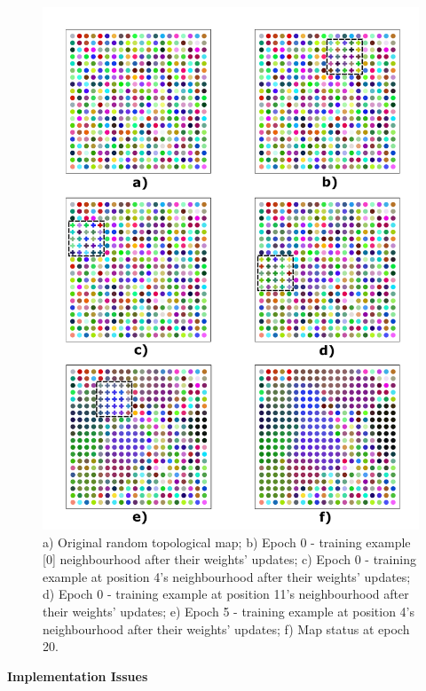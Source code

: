 \begin{figure}[h!]
\centering
\includegraphics[scale=0.35]{"Part 3 - Learning Systems/Unsupervised Learning/Self-Organizing Maps/figs/SOM_Exec.pdf"}
\caption{a) Original random topological map; b) Epoch 0 - training example [0] neighbourhood after their weights' updates; c) Epoch 0 - training example at position 4's  neighbourhood after their weights' updates; d) Epoch 0 - training example at position 11's neighbourhood after their weights' updates; e) Epoch 5 - training example at position 4's neighbourhood after their weights' updates; f) Map status at epoch 20.}
\label{fig:execution}
\end{figure}



\vspace{0.2cm}

\noindent \textbf{Implementation Issues}


